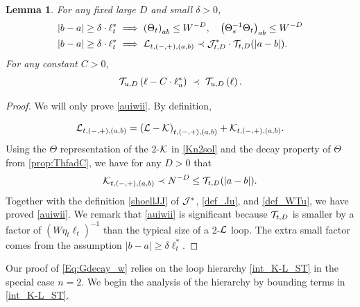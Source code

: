 \documentclass[10pt,reqno]{article}
\theoremstyle{plain} %
\newtheorem{lemma}[theorem]{Lemma}
\theoremstyle{remark}
\numberwithin{equation}{section}
\begin{document}
\begin{lemma}\label{lem_dec_calE_0}
For any fixed large $D$ and small $\delta>0$,  
 \begin{align}
 \label{Kell*}
   |b -a|\ge \delta \cdot \ell_t^* &\implies 
   \left({\Theta}_t\right)_{ab } \le W^{-D} ,\quad    \left({\Theta}_s^{-1}{\Theta}_t\right)_{ab } \le W^{-D}
   \\
  |b -a|\ge \delta \cdot \ell_t^* 
 & \implies  {\cal L}_{t, (-,+),(a, b)} \prec {\cal J}^*_{t,D}\cdot{\cal T}_{t,D}(|a-b|) . \label{auiwii}
\end{align}
For any constant $C>0$, \begin{equation}\label{Tell*}
       { {\cal T}_{u,D} \left(\ell-C\cdot \ell_u^*\right)}\;\prec \;  {\cal T}_{u,D} \left(\ell \right).
\end{equation} 

\end{lemma}
\begin{proof} We will only prove \eqref{auiwii}. By definition, 

\[
{\cal L}_{t, (-,+),(a, b)} = \left({\cal L} - \cal K\right)_{t, (-,+),(a, b)} + {\cal K}_{t, (-,+),(a, b)}.
\]
Using the $\Theta$ representation of the 2-\(\cal K\) in \eqref{Kn2sol} and the decay property of \(\Theta\) from \eqref{prop:ThfadC}, we have  for any \(D > 0\) that 
\[
{\cal K}_{t, (-,+),(a, b)} \prec N^{-D} \leq {\cal T}_{t, D}(|a-b|).
\]
Together with the definition \eqref{shoellJJ}  of \(\cal J^*\), \eqref{def_Ju}, and \eqref{def_WTu}, we have proved  \eqref{auiwii}.
We remark that \eqref{auiwii} is significant because ${\cal T}_{t,D}$ is smaller by a factor of
$(W\eta_t\ell_t)^{-1}$ than the typical size of a 2-${\cal L}$ loop. The extra small factor comes from the assumption $|b-a|\ge \delta\ell_t^*$.
\end{proof} 

Our proof of \eqref{Eq:Gdecay_w}   relies on the loop hierarchy \eqref{int_K-L_ST} in the special case $n=2$. 
We begin the analysis of the hierarchy by  bounding  terms in \eqref{int_K-L_ST}.  
\end{document}
